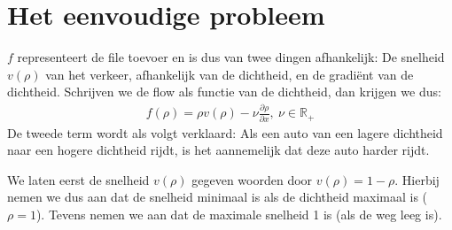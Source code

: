 \documentclass{article}
\begin{document}
\section*{Het eenvoudige probleem}
\(f\) representeert de file toevoer en is dus van twee dingen afhankelijk: 
De snelheid \(v(\rho)\) van het verkeer, afhankelijk van de dichtheid, en de gradiënt van de dichtheid. Schrijven we de flow als functie van de dichtheid, dan krijgen we dus:
\begin{align}
	f(\rho)=\rho v(\rho)-\nu \frac{\partial \rho}{\partial x},~\nu \in \mathbb{R}_+
\end{align}
De tweede term wordt als volgt verklaard:
Als een auto van een lagere dichtheid naar een hogere dichtheid rijdt, is het aannemelijk dat deze auto harder rijdt.

We laten eerst de snelheid \(v(\rho)\) gegeven woorden door \(v(\rho)=1-\rho\). Hierbij nemen we dus aan dat de snelheid minimaal is als de dichtheid maximaal is (\(\rho=1\)). Tevens nemen we aan dat de maximale snelheid 1 is (als de weg leeg is).
\end{document}
